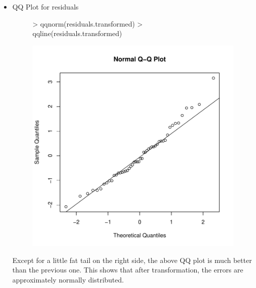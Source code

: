 \documentclass[12pt]{article}
\begin{document}
\begin{itemize}
\item QQ Plot for residuals
\begin{figure}[H]
\begin{Schunk}
\begin{Sinput}
> qqnorm(residuals.transformed)
> qqline(residuals.transformed)
\end{Sinput}
\end{Schunk}
\includegraphics{HW3-018}
\end{figure}
Except for a little fat tail on the right side, the above QQ plot is much better than the previous one. This shows that after transformation, the errors are approximately normally distributed.    
\end{itemize}

\clearpage
\end{document}
